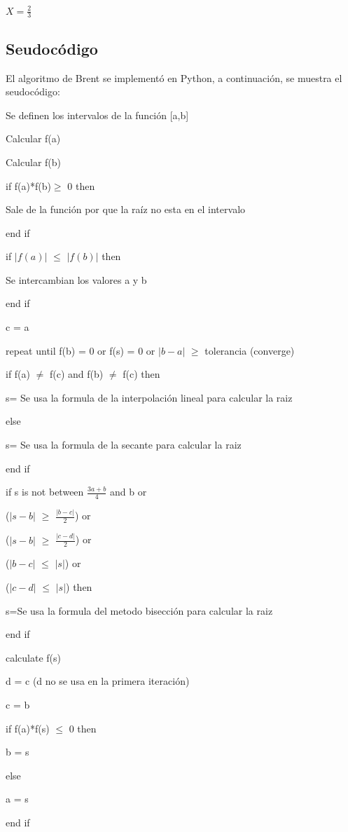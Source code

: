 \documentclass{article}
\begin{document}
$X=\frac{2}{3}$
\subsection{Seudocódigo}
El algoritmo de Brent se implementó en Python, a continuación, se muestra el seudocódigo:

Se definen los intervalos de la función [a,b]

Calcular f(a)

Calcular f(b)

if f(a)*f(b)$\geq$ 0 then 

  Sale de la función por que la raíz no esta en el intervalo
  
end if

if $|f(a)|$ $\leq$ $|f(b)|$ then

  Se intercambian los valores a y b
  
end if

c = a

repeat until f(b) = 0 or f(s) = 0 or $|b-a|$ $\geq$ tolerancia (converge)

  if f(a) 	$\neq$ f(c) and f(b) $	\neq$ f(c) then
  
     s= Se usa la formula de la interpolación lineal para calcular la raiz 
     
  else
  
     	s= Se usa la formula de la secante para calcular la raiz 
     	
  end if
  
  if  s is not between $\frac{3a+b}{4}$ and b or
  
     ($|s-b|$ $\geq$  $\frac{|b-c|}{2}$) or
     
     ($|s-b|$ $\geq$  $\frac{|c-d|}{2}$) or
     
     ($|b-c|$ $\leq$  $|s|$) or
     
     ($|c-d|$ $\leq$  $|s|$) then
     
      s=Se usa la formula del metodo  bisección para calcular la raiz
      
  end if
  
  calculate f(s)
  
  d = c  (d no se usa en la primera iteración)   
  
  c = b

  if f(a)*f(s) $\leq$  0 then
  
    b = s 
    
  else
  
    a = s 
    
  end if
\end{document}
